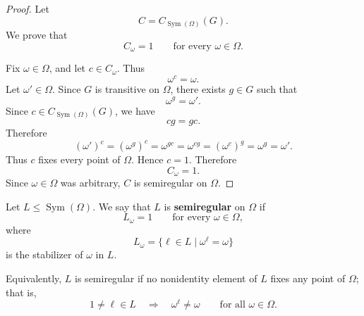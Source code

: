     \begin{proof}
    Let
    \[
        C=C_{\operatorname{Sym}(\Omega)}(G).
    \]
    We prove that
    \[
        C_\omega=1
        \qquad
        \text{for every } \omega\in\Omega.
    \]
    
    Fix \(\omega\in\Omega\), and let \(c\in C_\omega\). Thus
    \[
        \omega^c=\omega.
    \]
    Let \(\omega'\in\Omega\). Since \(G\) is transitive on \(\Omega\), there exists
    \(g\in G\) such that
    \[
        \omega^g=\omega'.
    \]
    Since \(c\in C_{\operatorname{Sym}(\Omega)}(G)\), we have
    \[
        cg=gc.
    \]
    Therefore
    \[
        (\omega')^c
        =
        (\omega^g)^c
        =
        \omega^{gc}
        =
        \omega^{cg}
        =
        (\omega^c)^g
        =
        \omega^g
        =
        \omega'.
    \]
    Thus \(c\) fixes every point of \(\Omega\). Hence \(c=1\). Therefore
    \[
        C_\omega=1.
    \]
    Since \(\omega\in\Omega\) was arbitrary, \(C\) is semiregular on \(\Omega\).
    \end{proof}

    \begin{definition}
        Let \(L\leq \operatorname{Sym}(\Omega)\). We say that \(L\) is
        \textbf{semiregular} on \(\Omega\) if
        \[
            L_\omega=1
            \qquad
            \text{for every } \omega\in\Omega,
        \]
        where
        \[
            L_\omega=\{\ell\in L\mid \omega^\ell=\omega\}
        \]
        is the stabilizer of \(\omega\) in \(L\).
        
        Equivalently, \(L\) is semiregular if no nonidentity element of \(L\) fixes any point of
        \(\Omega\); that is,
        \[
            1\neq \ell\in L
            \quad\Longrightarrow\quad
            \omega^\ell\neq \omega
            \qquad
            \text{for all } \omega\in\Omega.
        \]
        \end{definition}


